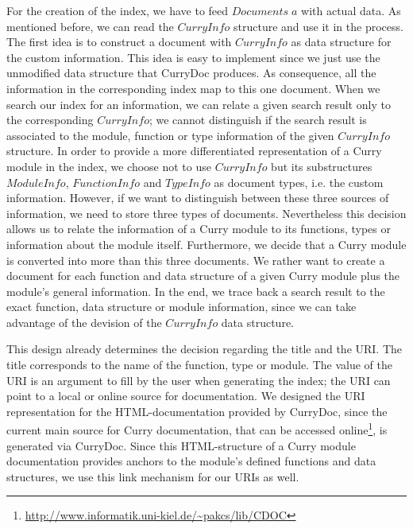 \documentclass[%
	pdftex,%
	a4paper,%
	oneside,%
	chapterprefix,%
	headsepline,%
	12pt%
]{scrbook}
\newcommand{\Conid}[1]{\mathit{#1}}
\newcommand{\Varid}[1]{\mathit{#1}}
\begin{document}
For the creation of the index, we have to feed \ensuremath{\Conid{Documents}\;\Varid{a}} with
actual data. %
As mentioned before, we can read the \ensuremath{\Conid{CurryInfo}} structure and use it
in the process. %
The first idea is to construct a document with \ensuremath{\Conid{CurryInfo}} as data
structure for the custom information. %
This idea is easy to implement since we just use the unmodified data
structure that CurryDoc produces. %
As consequence, all the information in the corresponding index map to
this one document. %
When we search our index for an information, we can relate a given
search result only to the corresponding \ensuremath{\Conid{CurryInfo}}; we cannot
distinguish if the search result is associated to the module, function
or type information of the given \ensuremath{\Conid{CurryInfo}} structure. %
In order to provide a more differentiated representation of a Curry
module in the index, we choose not to use \ensuremath{\Conid{CurryInfo}} but its
substructures \ensuremath{\Conid{ModuleInfo}}, \ensuremath{\Conid{FunctionInfo}} and \ensuremath{\Conid{TypeInfo}} as document
types, i.e. the custom information. %
However, if we want to distinguish between these three sources of
information, we need to store three types of documents. %
Nevertheless this decision allows us to relate the information of a
Curry module to its functions, types or information about the module
itself. %
Furthermore, we decide that a Curry module is converted into more than
this three documents. %
We rather want to create a document for each function and data
structure of a given Curry module plus the module's general
information. %
In the end, we trace back a search result to the exact function, data
structure or module information, since we can take advantage of the
devision of the \ensuremath{\Conid{CurryInfo}} data structure. %

This design already determines the decision regarding the title and
the URI. %
The title corresponds to the name of the function, type or module. %
The value of the URI is an argument to fill by the user when
generating the index; the URI can point to a local or online source
for documentation. %
We designed the URI representation for the HTML-documentation provided
by CurryDoc, since the current main source for Curry documentation,
that can be accessed
online\footnote{\url{http://www.informatik.uni-kiel.de/~pakcs/lib/CDOC}},
is generated via CurryDoc. %
Since this HTML-structure of a Curry module documentation provides
anchors to the module's defined functions and data structures, we use
this link mechanism for our URIs as well. %
\end{document}
